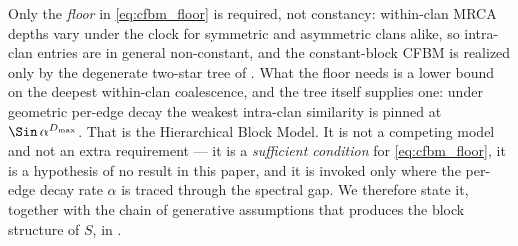 Only the \emph{floor} in \eqref{eq:cfbm_floor} is required, not constancy: within-clan
MRCA depths vary under the clock for symmetric and asymmetric clans alike, so
intra-clan entries are in general non-constant, and the constant-block CFBM is realized only
by the degenerate two-star tree of . What the floor
needs is a lower bound on the deepest within-clan coalescence, and the tree itself
supplies one: under geometric per-edge decay the weakest intra-clan similarity is
pinned at $\Sin\,\alpha^{D_{\max}}$. That is the Hierarchical Block Model. It is
not a competing model and not an extra requirement --- it is a \emph{sufficient
condition} for \eqref{eq:cfbm_floor}, it is a hypothesis of no result in this paper,
and it is invoked only where the per-edge decay rate $\alpha$ is traced through the
spectral gap. We therefore state it, together with the chain of generative
assumptions that produces the block structure of $S$, in .

